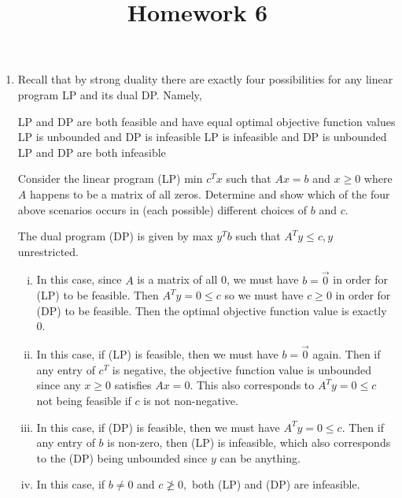\documentclass{article}
\begin{document}
\title{Homework 6}
\maketitle
\thispagestyle{fancy}

\begin{enumerate}
	\item Recall that by strong duality there are exactly four possibilities for any linear program LP and its dual DP. Namely,
		\begin{enumerate}[i)]
				\ii LP and DP are both feasible and have equal optimal objective function values
				\ii LP is unbounded and DP is infeasible
				\ii LP is infeasible and DP is unbounded
				\ii LP and DP are both infeasible
		\end{enumerate}

		Consider the linear program (LP) min $c^T x$ such that $Ax=b$ and $x\ge 0$ where $A$ happens to be a matrix of all zeros. Determine and show which of the four above scenarios occurs in (each possible) different choices of $b$ and $c.$
		\begin{soln}
			The dual program (DP) is given by max $y^T b$ such that $A^T y \le c, y$ unrestricted.
			\begin{enumerate}[i)]
				\item In this case, since $A$ is a matrix of all 0, we must have $b=\vec{0}$ in order for (LP) to be feasible. Then $A^T y = 0\le c$ so we must have $c\ge 0$ in order for (DP) to be feasible. Then the optimal objective function value is exactly 0.

				\item In this case, if (LP) is feasible, then we must have $b=\vec{0}$ again. Then if any entry of $c^T$ is negative, the objective function value is unbounded since any $x\ge 0$ satisfies $Ax=0.$ This also corresponds to $A^T y = 0 \le c$ not being feasible if $c$ is not non-negative.

				\item In this case, if (DP) is feasible, then we must have $A^T y = 0\le c.$ Then if any entry of $b$ is non-zero, then (LP) is infeasible, which also corresponds to the (DP) being unbounded since $y$ can be anything. 

				\item In this case, if $b\neq 0$ and $c\not\ge 0,$ both (LP) and (DP) are infeasible.
					
			\end{enumerate}
		\end{soln}


\end{enumerate}
\end{document}
